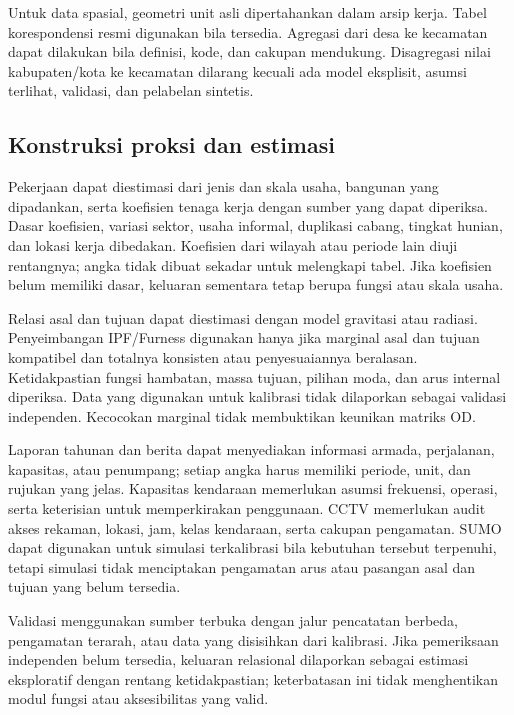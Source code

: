 \documentclass[11pt,a4paper,oneside,openany,indonesian]{report}
\begin{document}
Untuk data spasial, geometri unit asli dipertahankan dalam arsip kerja.
Tabel korespondensi resmi digunakan bila tersedia. Agregasi dari desa ke
kecamatan dapat dilakukan bila definisi, kode, dan cakupan mendukung.
Disagregasi nilai kabupaten/kota ke kecamatan dilarang kecuali ada model
eksplisit, asumsi terlihat, validasi, dan pelabelan sintetis.

\subsection{Konstruksi proksi dan
estimasi}\label{konstruksi-proksi-dan-estimasi}

Pekerjaan dapat diestimasi dari jenis dan skala usaha, bangunan yang
dipadankan, serta koefisien tenaga kerja dengan sumber yang dapat
diperiksa. Dasar koefisien, variasi sektor, usaha informal, duplikasi
cabang, tingkat hunian, dan lokasi kerja dibedakan. Koefisien dari
wilayah atau periode lain diuji rentangnya; angka tidak dibuat sekadar
untuk melengkapi tabel. Jika koefisien belum memiliki dasar, keluaran
sementara tetap berupa fungsi atau skala usaha.

Relasi asal dan tujuan dapat diestimasi dengan model gravitasi atau
radiasi. Penyeimbangan IPF/Furness digunakan hanya jika marginal asal
dan tujuan kompatibel dan totalnya konsisten atau penyesuaiannya
beralasan. Ketidakpastian fungsi hambatan, massa tujuan, pilihan moda,
dan arus internal diperiksa. Data yang digunakan untuk kalibrasi tidak
dilaporkan sebagai validasi independen. Kecocokan marginal tidak
membuktikan keunikan matriks OD.

Laporan tahunan dan berita dapat menyediakan informasi armada,
perjalanan, kapasitas, atau penumpang; setiap angka harus memiliki
periode, unit, dan rujukan yang jelas. Kapasitas kendaraan memerlukan
asumsi frekuensi, operasi, serta keterisian untuk memperkirakan
penggunaan. CCTV memerlukan audit akses rekaman, lokasi, jam, kelas
kendaraan, serta cakupan pengamatan. SUMO dapat digunakan untuk simulasi
terkalibrasi bila kebutuhan tersebut terpenuhi, tetapi simulasi tidak
menciptakan pengamatan arus atau pasangan asal dan tujuan yang belum tersedia.

Validasi menggunakan sumber terbuka dengan jalur pencatatan berbeda,
pengamatan terarah, atau data yang disisihkan dari kalibrasi. Jika
pemeriksaan independen belum tersedia, keluaran relasional dilaporkan
sebagai estimasi eksploratif dengan rentang ketidakpastian; keterbatasan
ini tidak menghentikan modul fungsi atau aksesibilitas yang valid.
\end{document}
